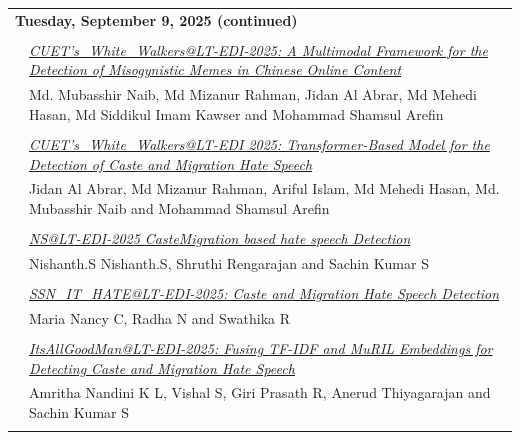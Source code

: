 \documentclass[11pt,oneside]{book}
\begin{document}
          \begin{tabular}{p{24mm}p{124mm}}
    \multicolumn{2}{l}{\bf Tuesday, September 9, 2025 (continued)} \\\\
          
                      & \hyperlink{page.68}{\emph{CUET's\_White\_Walkers@LT-EDI-2025: A Multimodal Framework for the Detection of Misogynistic Memes in Chinese Online Content}}\\
        & Md. Mubasshir Naib\index{Naib}, Md Mizanur Rahman\index{Rahman}, Jidan Al Abrar\index{Abrar}, Md Mehedi Hasan\index{Hasan}, Md Siddikul Imam Kawser\index{Kawser} and Mohammad Shamsul Arefin\index{Arefin}\\\\
                
                      & \hyperlink{page.75}{\emph{CUET's\_White\_Walkers@LT-EDI 2025: Transformer-Based Model for the Detection of Caste and Migration Hate Speech}}\\
        & Jidan Al Abrar\index{Abrar}, Md Mizanur Rahman\index{Rahman}, Ariful Islam\index{Islam}, Md Mehedi Hasan\index{Hasan}, Md. Mubasshir Naib\index{Naib} and Mohammad Shamsul Arefin\index{Arefin}\\\\
                
                      & \hyperlink{page.80}{\emph{NS@LT-EDI-2025 CasteMigration based hate speech Detection}}\\
        & Nishanth.S Nishanth.S\index{Nishanth.S}, Shruthi Rengarajan\index{Rengarajan} and Sachin Kumar S\index{S}\\\\
                
                      & \hyperlink{page.84}{\emph{SSN\_IT\_HATE@LT-EDI-2025: Caste and Migration Hate Speech Detection}}\\
        & Maria Nancy C\index{C}, Radha N\index{N} and Swathika R\index{R}\\\\
                
                      & \hyperlink{page.90}{\emph{ItsAllGoodMan@LT-EDI-2025: Fusing TF-IDF and MuRIL Embeddings for Detecting Caste and Migration Hate Speech}}\\
        & Amritha Nandini K L\index{L}, Vishal S\index{S}, Giri Prasath R\index{R}, Anerud Thiyagarajan\index{Thiyagarajan} and Sachin Kumar S\index{S}\\\\
                

\end{tabular}
\end{document}
